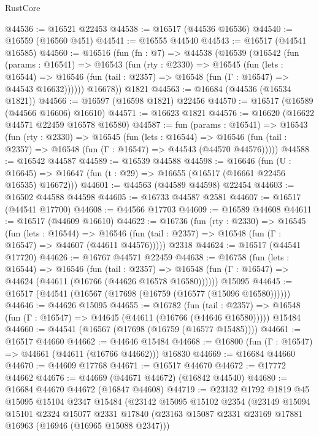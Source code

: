 \begin{lexlean}{RustCore}
\begin{coremodule}
@44536 := @16521 @22453
@44538 := @16517 (@44536 @16536)
@44540 := @16559 (@16560 @451)
@44541 := @16555 @44540
@44543 := @16517 (@44541 @16585)
@44560 := @16516
    (fun (fn : @7) =>
    @44538
      (@16539
        (@16542
          (fun (params : @16541) =>
          @16543
            (fun (rty : @2330) =>
            @16545
              (fun (lets : @16544) =>
              @16546 (fun (tail : @2357) => @16548 (fun (Γ : @16547) => @44543 @16632))))))
        @16678))
    @1821
@44563 := @16684 (@44536 (@16534 @1821))
@44566 := @16597 (@16598 @1821) @22456
@44570 := @16517 (@16589 (@44566 @16606) @16610)
@44571 := @16623 @1821
@44576 := @16620 (@16622 @44571 @22459 @16578 @16580)
@44587 := fun (params : @16541) =>
  @16543
    (fun (rty : @2330) =>
    @16545
      (fun (lets : @16544) =>
      @16546 (fun (tail : @2357) => @16548 (fun (Γ : @16547) => @44543 (@44570 @44576)))))
@44588 := @16542 @44587
@44589 := @16539 @44588
@44598 := @16646
    (fun (U : @16645) => @16647 (fun (t : @29) => @16655 (@16517 (@16661 @22456 @16535) @16672)))
@44601 := @44563 (@44589 @44598) @22454
@44603 := @16502 @44588 @44598
@44605 := @16733 @44587 @2581
@44607 := @16517 (@44541 @17700)
@44608 := @44566 @17703
@44609 := @16589 @44608
@44611 := @16517 (@44609 @16610)
@44622 := @16736
    (fun (rty : @2330) =>
    @16545
      (fun (lets : @16544) =>
      @16546 (fun (tail : @2357) => @16548 (fun (Γ : @16547) => @44607 (@44611 @44576)))))
    @2318
@44624 := @16517 (@44541 @17720)
@44626 := @16767 @44571 @22459
@44638 := @16758
    (fun (lets : @16544) =>
    @16546
      (fun (tail : @2357) =>
      @16548 (fun (Γ : @16547) => @44624 (@44611 (@16766 (@44626 @16578 @16580))))))
    @15095
@44645 := @16517 (@44541 (@16567 (@17698 (@16759 (@16577 (@15096 @16580))))))
@44646 := @44626 @15095
@44655 := @16782
    (fun (tail : @2357) => @16548 (fun (Γ : @16547) => @44645 (@44611 (@16766 (@44646 @16580)))))
    @15484
@44660 := @44541 (@16567 (@17698 (@16759 (@16577 @15485))))
@44661 := @16517 @44660
@44662 := @44646 @15484
@44668 := @16800 (fun (Γ : @16547) => @44661 (@44611 (@16766 @44662))) @16830
@44669 := @16684 @44660
@44670 := @44609 @17768
@44671 := @16517 @44670
@44672 := @17772 @44662
@44676 := @44669 (@44671 @44672) (@16842 @44540)
@44680 := @16684 @44670 @44672 (@16847 @44608)
@44719 := @23132
    @1792
    @1819
    @45
    @15095
    @15104
    @2347
    @15484
    (@23142
      @15095
      @15102
      @2354
      (@23149
        @15094
        @15101
        @2324
        @15077
        @2331
        @17840
        (@23163 @15087 @2331 @23169 @17881 @16963 (@16946 (@16965 @15088 @2347)))

\end{coremodule}
\end{lexlean}
